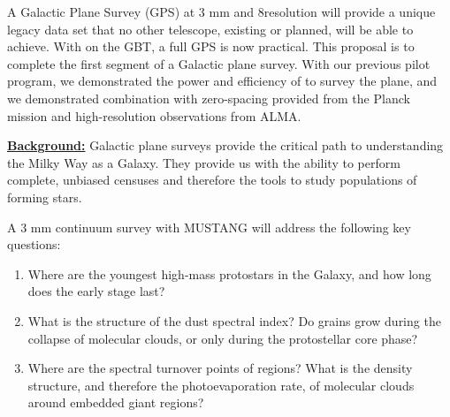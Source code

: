 \documentclass[11pt,preprint]{aastex_nofoot}
\begin{document}


A Galactic Plane Survey (GPS) at 3 mm and 8\arcsec resolution will provide a
unique legacy data set that no other telescope, existing or planned, will be
able to achieve.  With \MUSTANG on the GBT, a full GPS is now practical.  This
proposal is to complete the first segment of a Galactic plane survey.  With
our previous pilot program, we demonstrated the power and efficiency of \MUSTANG
to survey the plane, and we demonstrated combination with zero-spacing provided
from the Planck mission and high-resolution observations from ALMA.


\underline{\bf Background:}
Galactic plane surveys provide the critical path to understanding the Milky Way
as a Galaxy.  They provide us with the ability to perform complete, unbiased
censuses and therefore the tools to study populations of forming stars.

A 3 mm continuum survey with MUSTANG will address the following key questions:

\begin{enumerate}

    \item Where are the youngest high-mass protostars in the Galaxy, and how
        long does the early \hchii stage last?
    \item What is the structure of the dust spectral index?  Do grains grow
        during the collapse of molecular clouds, or only during the protostellar
        core phase?
    \item Where are the spectral turnover points of \hii regions?  What is the
        density structure, and therefore the photoevaporation rate, of 
        molecular clouds around embedded giant \hii regions?

\end{enumerate}
\end{document}
